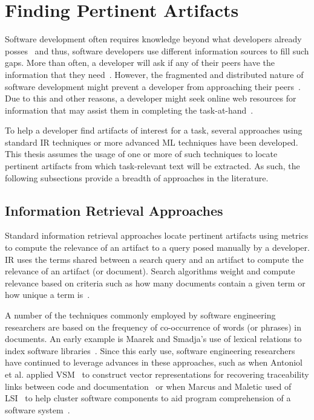 \section{Finding Pertinent Artifacts}
\label{cp2:foraging-tools}



Software development often requires knowledge beyond what developers already posses~\cite{Li2013} and thus, 
software developers use different information sources to fill such gaps. 
More than often, a developer will ask if any of their 
peers have the information that they need~\cite{singer2011}. 
However, the fragmented and distributed nature of software development  
might prevent a developer from approaching their peers~\cite{ko2007}.
Due to this and other reasons, a developer might seek
online web resources for information 
that may assist them in completing the task-at-hand~\cite{Xia2017, rao2020}.




To help a developer find artifacts of interest for a task,
several approaches
using 
standard \acf{IR} techniques or more advanced \acf{ML} techniques have been developed.
This thesis assumes the usage of one or more of such techniques to locate pertinent
artifacts
from which task-relevant text will be extracted. As such, the following 
subsections provide a breadth of approaches in the literature. 




\subsection{Information Retrieval Approaches} 



Standard information retrieval approaches locate pertinent artifacts
using metrics to compute the relevance of an artifact to a query posed manually by a developer.
\acs{IR} uses the terms shared between a search query and an artifact
to compute the relevance of an artifact (or document).
Search algorithms weight and compute relevance based on 
criteria such as how many documents contain a given term or  
how unique a term is~\cite{Manning2009IR}.



A number of the techniques commonly employed by software engineering researchers are based on the
frequency of co-occurrence of words (or phrases) in documents.
An early example is Maarek and Smadja's use of lexical relations to index
software libraries~\cite{maarek1989}.
Since this early use, software engineering
researchers have continued to leverage advances in
these approaches, such as when
Antoniol et al. applied \acf{VSM}~\cite{Salton1975vsm} 
to construct vector representations 
for recovering traceability links 
between code and documentation~\cite{antoniol1999, antoniol2000}
or when Marcus and Maletic used of \acf{LSI}~\cite{deerwester1990LSI}
to help cluster software components to aid
program comprehension of a software system~\cite{Marcus2003}.



